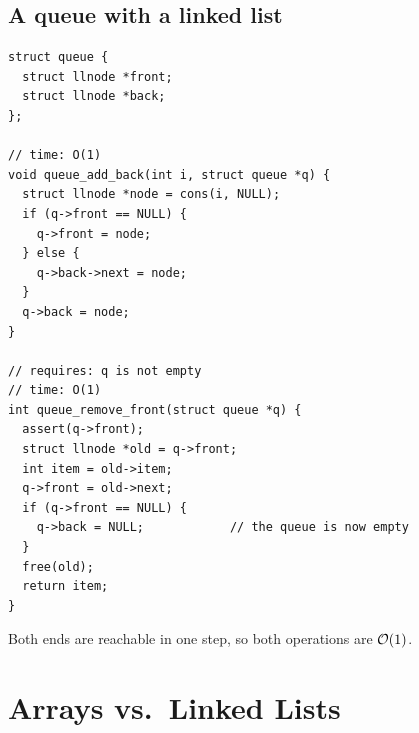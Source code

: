 \subsection{A queue with a linked list}
\begin{lstlisting}[style=c]
struct queue {
  struct llnode *front;
  struct llnode *back;
};

// time: O(1)
void queue_add_back(int i, struct queue *q) {
  struct llnode *node = cons(i, NULL);
  if (q->front == NULL) {
    q->front = node;
  } else {
    q->back->next = node;
  }
  q->back = node;
}

// requires: q is not empty
// time: O(1)
int queue_remove_front(struct queue *q) {
  assert(q->front);
  struct llnode *old = q->front;
  int item = old->item;
  q->front = old->next;
  if (q->front == NULL) {
    q->back = NULL;            // the queue is now empty
  }
  free(old);
  return item;
}
\end{lstlisting}

\begin{center}
\end{center}
Both ends are reachable in one step, so both operations are $\mathcal{O}(1)$.

\section{Arrays vs.\ Linked Lists}

